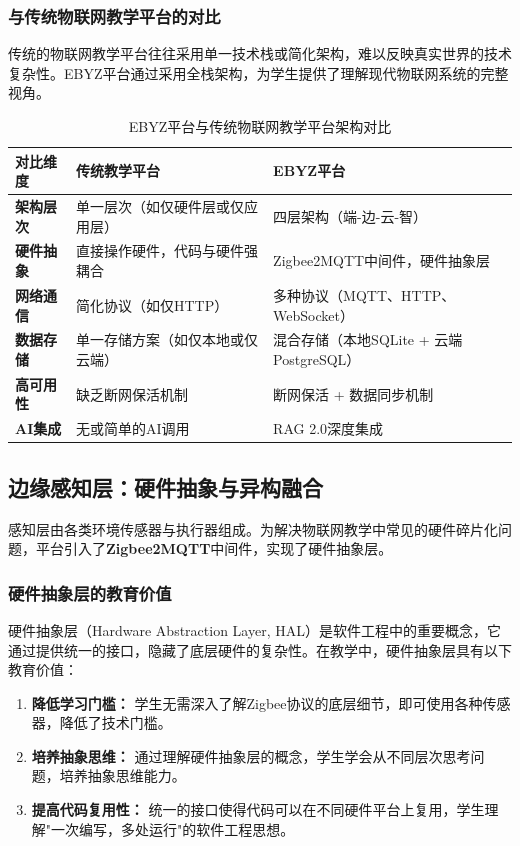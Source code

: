 \documentclass[12pt,a4paper,fontset=fandol]{ctexart}
\begin{document}
\subsubsection{与传统物联网教学平台的对比}
传统的物联网教学平台往往采用单一技术栈或简化架构，难以反映真实世界的技术复杂性。EBYZ平台通过采用全栈架构，为学生提供了理解现代物联网系统的完整视角。

\begin{table}[H]
    \centering
    \caption{EBYZ平台与传统物联网教学平台架构对比}
    \label{tab:architecture-comparison}
    \begin{tabular}{p{2.5cm}p{4cm}p{4cm}}
        \toprule
        \textbf{对比维度} & \textbf{传统教学平台} & \textbf{EBYZ平台} \\
        \midrule
        \textbf{架构层次} & 单一层次（如仅硬件层或仅应用层） & 四层架构（端-边-云-智） \\
        \midrule
        \textbf{硬件抽象} & 直接操作硬件，代码与硬件强耦合 & Zigbee2MQTT中间件，硬件抽象层 \\
        \midrule
        \textbf{网络通信} & 简化协议（如仅HTTP） & 多种协议（MQTT、HTTP、WebSocket） \\
        \midrule
        \textbf{数据存储} & 单一存储方案（如仅本地或仅云端） & 混合存储（本地SQLite + 云端PostgreSQL） \\
        \midrule
        \textbf{高可用性} & 缺乏断网保活机制 & 断网保活 + 数据同步机制 \\
        \midrule
        \textbf{AI集成} & 无或简单的AI调用 & RAG 2.0深度集成 \\
        \bottomrule
    \end{tabular}
\end{table}

\subsection{边缘感知层：硬件抽象与异构融合}
感知层由各类环境传感器与执行器组成。为解决物联网教学中常见的硬件碎片化问题，平台引入了\textbf{Zigbee2MQTT}中间件，实现了硬件抽象层。

\subsubsection{硬件抽象层的教育价值}
硬件抽象层（Hardware Abstraction Layer, HAL）是软件工程中的重要概念，它通过提供统一的接口，隐藏了底层硬件的复杂性\cite{tanenbaum2014}。在教学中，硬件抽象层具有以下教育价值：

\begin{enumerate}
    \item \textbf{降低学习门槛：} 学生无需深入了解Zigbee协议的底层细节，即可使用各种传感器，降低了技术门槛。
    
    \item \textbf{培养抽象思维：} 通过理解硬件抽象层的概念，学生学会从不同层次思考问题，培养抽象思维能力。
    
    \item \textbf{提高代码复用性：} 统一的接口使得代码可以在不同硬件平台上复用，学生理解"一次编写，多处运行"的软件工程思想。
\end{enumerate}
\end{document}
